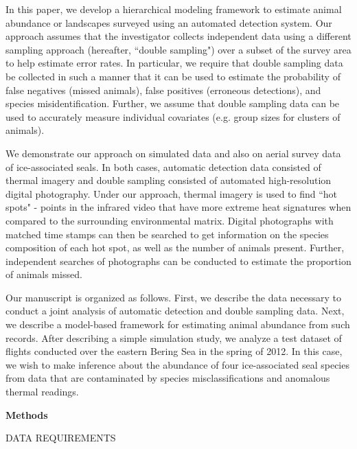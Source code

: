 \documentclass[12pt,fleqn]{article}
\begin{document}
\begin{flushleft}
\hspace{.5in}In this paper, we develop a hierarchical modeling framework to estimate animal abundance or landscapes surveyed using an automated detection system. Our approach assumes that the investigator collects independent data using a different sampling approach (hereafter, ``double sampling") over a subset of the survey area to help estimate error rates. In particular, we require that double sampling data be collected in such a manner that it can be used to estimate the probability of false negatives (missed animals), false positives (erroneous detections), and species misidentification.  Further, we assume that double sampling data can be used to accurately measure individual covariates (e.g. group sizes for clusters of animals).

\hspace{.5in}We demonstrate our approach on simulated data and also on aerial survey data of ice-associated seals.  In both cases, automatic detection data consisted of thermal imagery and double sampling consisted of automated high-resolution digital photography.
Under our approach, thermal imagery is used to find ``hot spots" - points in the infrared video that have more extreme heat signatures when compared to the surrounding environmental matrix.  Digital photographs with matched time stamps can then be searched to get information on the species composition of each hot spot, as well as the number of animals present.  Further, independent searches of photographs can be conducted to estimate the proportion of animals missed.

\hspace{.5in}Our manuscript is organized as follows.  First, we describe the data necessary to conduct a joint analysis of automatic detection and double sampling data. Next, we describe a model-based framework for estimating animal abundance from such records. After describing a simple simulation study, we analyze a test dataset of flights conducted over the eastern Bering Sea in the spring of 2012.  In this case, we wish to make inference about the
abundance of four ice-associated seal species from data that are contaminated by
species misclassifications and anomalous thermal readings.

\vspace{.3in}

{\bf Methods} \\
\vspace{.15in}

DATA REQUIREMENTS \\
\vspace{.15in}


\end{flushleft}
\end{document}
